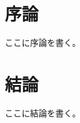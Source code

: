 \documentclass[10pt,a4paper,oneside,twocolumn,fleqn,dvipdfmx]{jsarticle}
\title{\Huge{\@documenttitle}}
\author{\Large{\@authorname}\\\@affiliation}
\date{}
\affiliation{東京大学 堀藤本研究室}
\begin{document}
\begin{abstract}
    ここに概要を書く。
\end{abstract}

\maketitle
\thispagestyle{fancy}

\section{序論}
ここに序論を書く。

\section{結論}
ここに結論を書く。

\begin{comment}

\begin{figure}[t]
\centering
\texttt{[image: figure\_name.pdf]}
\caption{Figure Name.}
\label{fig:fig_name}
\end{figure}

\begin{figure}[t]
\centering
\subfigure[Figure Name 1.]{\texttt{[image: figure\_name\_1.pdf]}\label{fig:fig_name_1}}
\subfigure[Figure Name 2.]{\texttt{[image: figure\_name\_2.pdf]}\label{fig:fig_name_2}}
\caption{Subfigure Name.}
\label{fig:subfigure_name}
\end{figure}




\end{comment}
\end{document}
